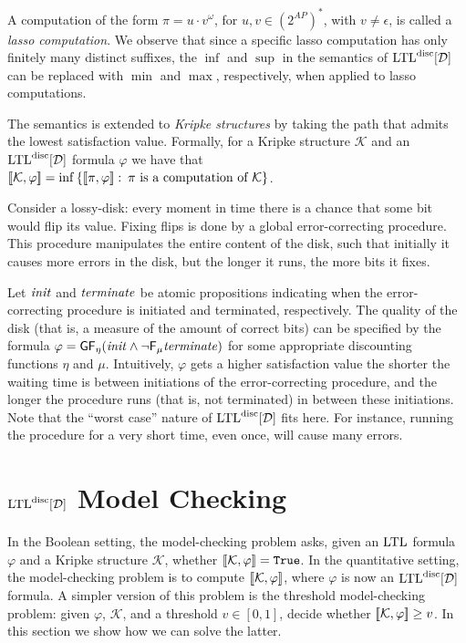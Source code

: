 \documentclass{llncs}
\newcommand{\set}[1]{{\left\{#1\right\}}}
\newcommand{\True}{\mathtt{True}}
\newcommand{\LTL}{{\ensuremath{\rm LTL}}\xspace}
\newcommand{\Ev}{\mathsf{F}}
\newcommand{\Alw}{\mathsf{G}}
\newcommand{\K}{{\mathcal K}}
\newcommand{\D}{{\cal D}}
\renewcommand{\phi}{\varphi}
\newcommand{\ST}{ : \:}
\newcommand{\DLTL}{\ensuremath{\LTL^{\text{disc}}[\D]}}
\newcommand{\LTLD}{\DLTL}
\begin{document}
A computation of the form $\pi=u\cdot v^\omega$, for $u,v\in (2^{AP})^*$, with $v\neq \epsilon$, is called a {\em lasso computation}. 
We observe that since a specific lasso computation has only finitely many distinct suffixes, the $\inf$ and $\sup$ in the semantics of $\DLTL$ can be replaced with $\min$ and $\max$, respectively, when applied to lasso computations.

The semantics is extended to {\em Kripke structures} by taking the path that admits the lowest satisfaction value. Formally, for a Kripke structure $\K$ and an $\DLTL$ formula $\phi$ we have that $\sem{\K,\phi}=\inf\set{\sem{\pi,\phi}\ST \pi \text{ is a computation of $\K$} }$.




\begin{example}
Consider a lossy-disk: every moment in time there is a chance that some bit would flip its value. Fixing flips is done by a global error-correcting procedure. This procedure manipulates the entire content of the disk, such that initially it causes more errors in the disk, but the longer it runs, the more bits it fixes. 

Let ${\it init}$ and ${\it terminate}$ be atomic propositions indicating when the error-correcting procedure is initiated and terminated, respectively.
The quality of the disk (that is, a measure of the amount of correct bits) can be specified by the formula $\phi=\Alw\Ev_\eta({\it init} \wedge \neg \Ev_\mu {\it terminate})$ for some appropriate discounting functions $\eta$ and $\mu$. 
Intuitively, $\phi$ gets a higher satisfaction value the shorter the waiting time is between initiations of the error-correcting procedure, and the longer the procedure runs (that is, not terminated) in between these initiations. Note that the ``worst case'' nature of $\LTLD$ fits here. For instance, running the procedure for a very short time, even once, will cause many errors.
\end{example}


\section{$\DLTL$ Model Checking}
\label{sec:alg proc}
In the Boolean setting, the model-checking problem asks, given an $\LTL$ formula $\phi$ and a Kripke structure $\K$, whether $\sem{\K,\phi}=\True$. In the quantitative setting, the model-checking problem is to compute $\sem{\K,\phi}$, where $\phi$ is now an $\DLTL$ formula. A simpler version of this problem is the threshold model-checking problem: given $\phi$, $\K$, and a threshold $v\in [0,1]$, decide whether $\sem{\K,\phi}\ge v$. In this section we show how we can solve the latter.
\end{document}
